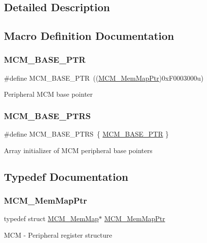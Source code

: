 \subsection{Detailed Description}


\subsection{Macro Definition Documentation}
\mbox{\label{group___m_c_m___peripheral_gad41e931f176c230831e3dbad45117841}} 
\subsubsection{\texorpdfstring{M\+C\+M\+\_\+\+B\+A\+S\+E\+\_\+\+P\+TR}{MCM\_BASE\_PTR}}
{\footnotesize\ttfamily \#define M\+C\+M\+\_\+\+B\+A\+S\+E\+\_\+\+P\+TR~((\hyperlink{group___m_c_m___peripheral_ga72e8bbe428d9410917903164d3a5f675}{M\+C\+M\+\_\+\+Mem\+Map\+Ptr})0x\+F0003000u)}

Peripheral M\+CM base pointer \mbox{\label{group___m_c_m___peripheral_gae2d5e838ce7d2d4108738c05bf224272}} 
\subsubsection{\texorpdfstring{M\+C\+M\+\_\+\+B\+A\+S\+E\+\_\+\+P\+T\+RS}{MCM\_BASE\_PTRS}}
{\footnotesize\ttfamily \#define M\+C\+M\+\_\+\+B\+A\+S\+E\+\_\+\+P\+T\+RS~\{ \hyperlink{group___m_c_m___peripheral_gad41e931f176c230831e3dbad45117841}{M\+C\+M\+\_\+\+B\+A\+S\+E\+\_\+\+P\+TR} \}}

Array initializer of M\+CM peripheral base pointers 

\subsection{Typedef Documentation}
\mbox{\label{group___m_c_m___peripheral_ga72e8bbe428d9410917903164d3a5f675}} 
\subsubsection{\texorpdfstring{M\+C\+M\+\_\+\+Mem\+Map\+Ptr}{MCM\_MemMapPtr}}
{\footnotesize\ttfamily typedef struct \hyperlink{struct_m_c_m___mem_map}{M\+C\+M\+\_\+\+Mem\+Map}$\ast$ \hyperlink{group___m_c_m___peripheral_ga72e8bbe428d9410917903164d3a5f675}{M\+C\+M\+\_\+\+Mem\+Map\+Ptr}}

M\+CM -\/ Peripheral register structure 
